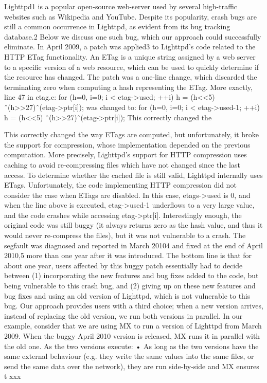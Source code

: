 \documentclass[a4paper,11pt,twoside]{report}
\begin{document}
Lighttpd1
is a popular open-source web-server used by
several high-traffic websites such as Wikipedia and YouTube.
Despite its popularity, crash bugs are still a common occurrence
in Lighttpd, as evident from its bug tracking database.2
Below we discuss one such bug, which our approach could
successfully eliminate.
In April 2009, a patch was applied3
to Lighttpd’s code related
to the HTTP ETag functionality. An ETag is a unique string
assigned by a web server to a specific version of a web resource,
which can be used to quickly determine if the resource has
changed. The patch was a one-line change, which discarded
the terminating zero when computing a hash representing the
ETag. More exactly, line 47 in etag.c:
for (h=0, i=0; i < etag->used; ++i) h = (h<<5)
ˆ(h>>27)ˆ(etag->ptr[i]);
was changed to:
for (h=0, i=0; i < etag->used-1; ++i) h = (h<<5)
ˆ(h>>27)ˆ(etag->ptr[i]);
This correctly changed the

This correctly changed the way ETags are computed, but
unfortunately, it broke the support for compression, whose
implementation depended on the previous computation. More
precisely, Lighttpd’s support for HTTP compression uses
caching to avoid re-compressing files which have not changed
since the last access. To determine whether the cached file
is still valid, Lighttpd internally uses ETags. Unfortunately,
the code implementing HTTP compression did not consider
the case when ETags are disabled. In this case, etags->used
is 0, and when the line above is executed, etag->used-1
underflows to a very large value, and the code crashes while
accessing etag->ptr[i]. Interestingly enough, the original
code was still buggy (it always returns zero as the hash value,
and thus it would never re-compress the files), but it was not
vulnerable to a crash.
The segfault was diagnosed and reported in March 20104
and
fixed at the end of April 2010,5 more than one year after it was
introduced. The bottom line is that for about one year, users
affected by this buggy patch essentially had to decide between
(1) incorporating the new features and bug fixes added to the
code, but being vulnerable to this crash bug, and (2) giving up
on these new features and bug fixes and using an old version
of Lighttpd, which is not vulnerable to this bug.
Our approach provides users with a third choice; when a
new version arrives, instead of replacing the old version, we
run both versions in parallel. In our example, consider that we
are using MX to run a version of Lighttpd from March 2009.
When the buggy April 2010 version is released, MX runs it in
parallel with the old one. As the two versions execute:
• As long as the two versions have the same external
behaviour (e.g. they write the same values into the same
files, or send the same data over the network), they are
run side-by-side and MX ensures t
xxx
\end{document}
